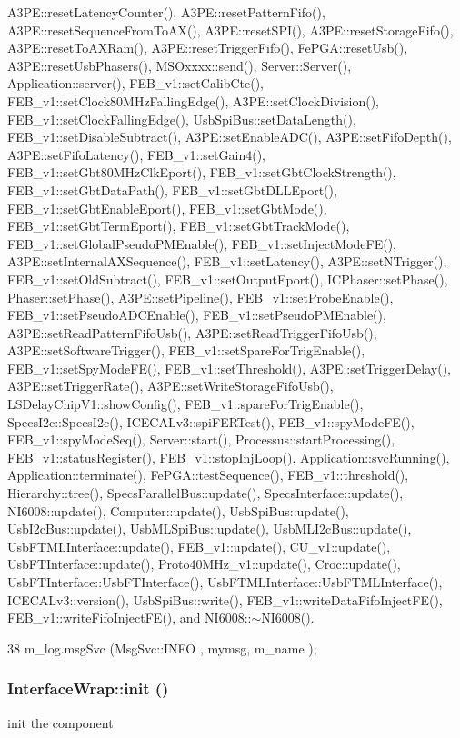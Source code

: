 A3PE::resetLatencyCounter(), A3PE::resetPatternFifo(), A3PE::resetSequenceFromToAX(), A3PE::resetSPI(), A3PE::resetStorageFifo(), A3PE::resetToAXRam(), A3PE::resetTriggerFifo(), FePGA::resetUsb(), A3PE::resetUsbPhasers(), MSOxxxx::send(), Server::Server(), Application::server(), FEB\_\-v1::setCalibCte(), FEB\_\-v1::setClock80MHzFallingEdge(), A3PE::setClockDivision(), FEB\_\-v1::setClockFallingEdge(), UsbSpiBus::setDataLength(), FEB\_\-v1::setDisableSubtract(), A3PE::setEnableADC(), A3PE::setFifoDepth(), A3PE::setFifoLatency(), FEB\_\-v1::setGain4(), FEB\_\-v1::setGbt80MHzClkEport(), FEB\_\-v1::setGbtClockStrength(), FEB\_\-v1::setGbtDataPath(), FEB\_\-v1::setGbtDLLEport(), FEB\_\-v1::setGbtEnableEport(), FEB\_\-v1::setGbtMode(), FEB\_\-v1::setGbtTermEport(), FEB\_\-v1::setGbtTrackMode(), FEB\_\-v1::setGlobalPseudoPMEnable(), FEB\_\-v1::setInjectModeFE(), A3PE::setInternalAXSequence(), FEB\_\-v1::setLatency(), A3PE::setNTrigger(), FEB\_\-v1::setOldSubtract(), FEB\_\-v1::setOutputEport(), ICPhaser::setPhase(), Phaser::setPhase(), A3PE::setPipeline(), FEB\_\-v1::setProbeEnable(), FEB\_\-v1::setPseudoADCEnable(), FEB\_\-v1::setPseudoPMEnable(), A3PE::setReadPatternFifoUsb(), A3PE::setReadTriggerFifoUsb(), A3PE::setSoftwareTrigger(), FEB\_\-v1::setSpareForTrigEnable(), FEB\_\-v1::setSpyModeFE(), FEB\_\-v1::setThreshold(), A3PE::setTriggerDelay(), A3PE::setTriggerRate(), A3PE::setWriteStorageFifoUsb(), LSDelayChipV1::showConfig(), FEB\_\-v1::spareForTrigEnable(), SpecsI2c::SpecsI2c(), ICECALv3::spiFERTest(), FEB\_\-v1::spyModeFE(), FEB\_\-v1::spyModeSeq(), Server::start(), Processus::startProcessing(), FEB\_\-v1::statusRegister(), FEB\_\-v1::stopInjLoop(), Application::svcRunning(), Application::terminate(), FePGA::testSequence(), FEB\_\-v1::threshold(), Hierarchy::tree(), SpecsParallelBus::update(), SpecsInterface::update(), NI6008::update(), Computer::update(), UsbSpiBus::update(), UsbI2cBus::update(), UsbMLSpiBus::update(), UsbMLI2cBus::update(), UsbFTMLInterface::update(), FEB\_\-v1::update(), CU\_\-v1::update(), UsbFTInterface::update(), Proto40MHz\_\-v1::update(), Croc::update(), UsbFTInterface::UsbFTInterface(), UsbFTMLInterface::UsbFTMLInterface(), ICECALv3::version(), UsbSpiBus::write(), FEB\_\-v1::writeDataFifoInjectFE(), FEB\_\-v1::writeFifoInjectFE(), and NI6008::$\sim$NI6008().


\begin{DoxyCode}
38 { m_log.msgSvc (MsgSvc::INFO    , mymsg, m_name ); }
\end{DoxyCode}
\hypertarget{structInterfaceWrap_a2660ecdfbabd91d99d7b64c83e92f33c}{
\subsubsection[{init}]{ InterfaceWrap::init ()}}
\label{structInterfaceWrap_a2660ecdfbabd91d99d7b64c83e92f33c}
init the component

